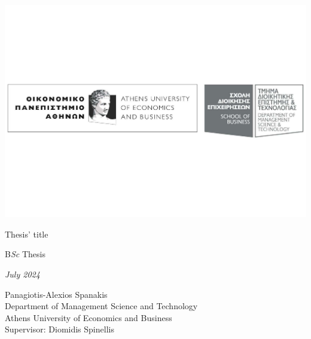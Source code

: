 
\centering
\includegraphics[width=\textwidth]{../figs/aueb_logo.pdf}


{\Large Thesis' title \par}
\vspace{3cm}
{B\emph{Sc} Thesis}

\vspace{2cm}
{\emph{July 2024}}

\vspace{2.5cm}



Panagiotis-Alexios Spanakis \\
Department of Management Science and Technology \\
Athens University of Economics and Business \\
Supervisor: Diomidis Spinellis
